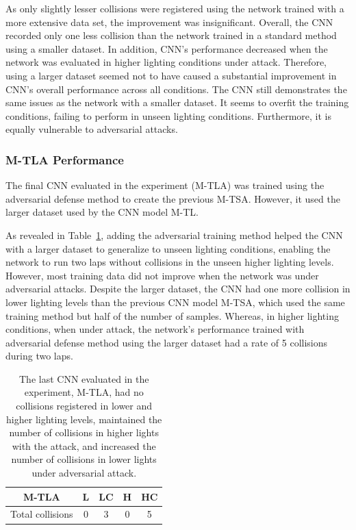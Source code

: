 \documentclass[12pt]{article}
\begin{document}
As only slightly lesser collisions were registered using the network trained with a more extensive data set, the improvement was insignificant. Overall, the CNN recorded only one less collision than the network trained in a standard method using a smaller dataset. In addition, CNN's performance decreased when the network was evaluated in higher lighting conditions under attack. Therefore, using a larger dataset seemed not to have caused a substantial improvement in CNN's overall performance across all conditions. The CNN still demonstrates the same issues as the network with a smaller dataset. It seems to overfit the training conditions, failing to perform in unseen lighting conditions. Furthermore, it is equally vulnerable to adversarial attacks. 

\subsubsection{M-TLA Performance}

The final CNN evaluated in the experiment (M-TLA) was trained using the adversarial defense method to create the previous M-TSA. However, it used the larger dataset used by the CNN model M-TL. 

As revealed in Table~\ref{tab:mtla}, adding the adversarial training method helped the CNN with a larger dataset to generalize to unseen lighting conditions, enabling the network to run two laps without collisions in the unseen higher lighting levels. However, most training data did not improve when the network was under adversarial attacks. Despite the larger dataset, the CNN had one more collision in lower lighting levels than the previous CNN model M-TSA, which used the same training method but half of the number of samples. Whereas, in higher lighting conditions, when under attack, the network's performance trained with adversarial defense method using the larger dataset had a rate of 5 collisions during two laps.

\begin{table}[H]
\begin{center}
\begin{tabular}{ |c|c|c|c|c| } 
\hline
M-TLA & L & LC & H & HC \\
\hline
Total collisions & 0 & 3 & 0 & 5 \\
\hline
\end{tabular}
\caption{\label{tab:mtla}The last CNN evaluated in the experiment, M-TLA, had no collisions registered in lower and higher lighting levels, maintained the number of collisions in higher lights with the attack, and increased the number of collisions in lower lights under adversarial attack.}
\end{center}
\end{table}
\end{document}
